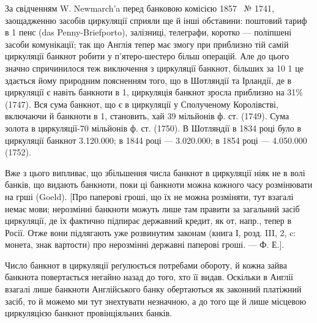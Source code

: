 За свідченням W. Newmarch’a перед банковою комісією 1857~ № 1741,
заощадженню засобів циркуляції сприяли ще й інші обставини: поштовий тариф
в 1 пенс (das Penny-Briefporto), залізниці, телеграфи, коротко — поліпшені засоби
комунікації; так що Англія тепер має змогу при приблизно тій самій циркуляції
банкнот робити у п’ятеро-шестеро більш операцій. Але до цього значно
спричинилося теж виключення з циркуляції банкнот, більших за 10 1 це
здається йому природним поясненням того, що в Шотляндії та Ірландії, де в
циркуляції є навіть банкноти в 1, циркуляція банкнот зросла приблизно
на 31\% (1747). Вся сума банкнот, що є в циркуляції у Сполученому Королівстві,
включаючи й банкноти в 1, становить, хай 39 мільйонів ф. ст.
(1749). Сума золота в циркуляції-70 мільйонів ф. ст. (1750). В Шотляндії
в 1834 році було в циркуляції банкнот \num{3.120.000}; в 1844 році —
\num{3.020.000}; в 1854 році — \num{4.050.000} (1752).

Вже з цього випливає, що збільшення числа банкнот в циркуляції ніяк
не в волі банків, що видають банкноти, поки ці банкноти можна кожного часу
розмінювати на грші (Goeld). [Про паперові гроші, що їх не можна розміняти,
тут взагалі немає мови; нерозмінні банкноти можуть лише там правити за загальний
засіб циркуляції, де їх фактично підпирає державний кредит, як от, напр., тепер
в Росії. Отже вони підлягають уже розвинутим законам (книга І, розд. III, 2, c:
монета, знак вартости) про нерозмінні державні паперові гроші. — Ф. Е.].

Число банкнот в циркуляції реґулюється потребами обороту, й кожна
зайва банкнота повертається негайно назад до того, хто її видав. Оскільки в
Англії взагалі лише банкноти Англійського банку обертаються як законний
платіжний засіб, то й можемо ми тут знехтувати незначною, а до того ще й лише
місцевою циркуляцією банкнот провінціяльних банків.
